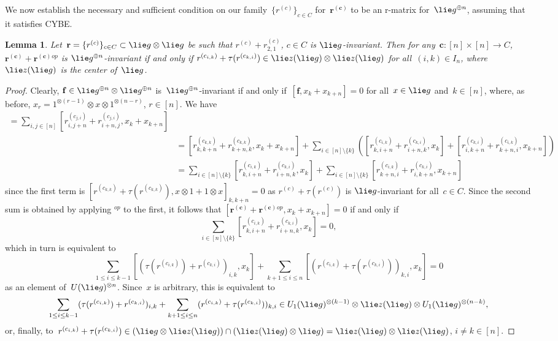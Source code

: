 \documentclass[12pt, reqno]{amsart}
\newtheorem{lemma}[theorem]{Lemma}
\theoremstyle{definition}
\numberwithin{equation}{section}
\newcommand{\tensor}{\otimes}
\begin{document}
We now establish the necessary and sufficient condition
on our family~$\{r^{(c)}\}_{c\in C}$
for~$\mathbf r^{(\mathbf c)}$ to be an r-matrix for~$\lie g^{\oplus n}$, assuming that it satisfies CYBE.
\begin{lemma}\label{lem:quasi invariant}
Let~$\mathbf r=\{ r^{(c)}\}_{c\in C}\subset \lie g\tensor \lie g$ be such that $r^{(c)}+r_{2,1}^{(c)}$, $c\in C$ is $\lie g$-invariant. Then for any~$\mathbf c:[n]\times[n]\to C$, $\mathbf r^{(\mathbf c)}+
\mathbf r^{(\mathbf c)}{}^{op}$ is $\lie g^{\oplus n}$-invariant if and only if 
$r^{(c_{i,k})}+\tau(r^{(c_{k,i})})\in \lie z(\lie g)\tensor \lie z(\lie g)$ for all~$(i,k)\in I_n$, where~$\lie z(\lie g)$
is the center of~$\lie g$.
\end{lemma}
\begin{proof}
Clearly, $\mathbf f\in \lie g^{\oplus n}\tensor \lie g^{\oplus n}$ is~$\lie g^{\oplus n}$-invariant
if and only if~$[\mathbf f,x_k+x_{k+n}]=0$ for all~$x\in\lie g$ and~$k\in[n]$, where, as before, $x_r=1^{\tensor(r-1)}\tensor x\tensor 1^{\tensor(n-r)}$, $r\in [n]$.
We have 
\begin{align*}
[\mathbf r^{(\mathbf c)}&+\mathbf r^{(\mathbf c)}{}^{op},x_k+x_{k+n}]=
\sum_{i,j\in[n]} [r_{i,j+n}^{(c_{j,i})}+
r_{i+n,j}^{(c_{j,i})},x_k+x_{k+n}]\\
&=[r_{k,k+n}^{(c_{k,k})}+r_{k+n,k}^{(c_{k,k})},x_k+x_{k+n}]
+\sum_{i\in[n]\setminus\{k\}}
([r_{k,i+n}^{(c_{i,k})}+r_{i+n,k}^{(c_{k,i})},x_k]
+[r_{i,k+n}^{(c_{k,i})}+r_{k+n,i}^{(c_{i,k})},x_{k+n}])\\
&=
\sum_{i\in[n]\setminus\{k\}}
[r_{k,i+n}^{(c_{i,k})}+r_{i+n,k}^{(c_{k,i})},x_k]
+\sum_{i\in[n]\setminus\{k\}}
[r_{k+n,i}^{(c_{i,k})}+r_{i,k+n}^{(c_{k,i})},x_{k+n}]
\end{align*}
since the first term is $[r^{(c_{k,k})}+\tau(r^{(c_{k,k})}),x\tensor 1+1\tensor x]_{k,k+n}=0$ as $r^{(c)}+\tau(r^{(c)})$ is $\lie g$-invariant for all~$c\in C$. Since the second sum
is obtained by applying ${}^{op}$ to the first,
it follows that
$[\mathbf r^{(\mathbf c)}+\mathbf r^{(\mathbf c)}{}^{op},x_k+x_{k+n}]=0$
if and only if
$$
\sum_{i\in[n]\setminus \{k\}}[r_{k,i+n}^{(c_{i,k})}+r_{i+n,k}^{(c_{k,i})},x_k]=0,
$$
which in turn is equivalent to
$$
\sum_{1\le i\le k-1} 
[(\tau(r^{(c_{i,k})})+r^{(c_{k,i})})_{i,k},x_k]
+\sum_{k+1\le i\le n}
[(r^{(c_{i,k})}+\tau(r^{(c_{k,i})}))_{k,i},x_k]=0
$$
as an element of~$U(\lie g)^{\tensor n}$. Since~$x$
is arbitrary, this is equivalent to
$$
\sum_{1\le i\le k-1} 
(\tau(r^{(c_{i,k})})+r^{(c_{k,i})})_{i,k}
+\sum_{k+1\le i\le n}
(r^{(c_{i,k})}+\tau(r^{(c_{k,i})}))_{k,i}
\in 
U_1(\lie g)^{\tensor(k-1)}\tensor\lie z(\lie g)\tensor 
U_1(\lie g)^{\tensor (n-k)},
$$
or, finally, to~$r^{(c_{i,k})}+\tau(r^{(c_{k,i})})
\in (\lie g\tensor \lie z(\lie g))
\cap (\lie z(\lie g)\tensor\lie g)=
\lie z(\lie g)\tensor\lie z(\lie g)$, $i\not=k\in[n]$.
\end{proof}
\end{document}
